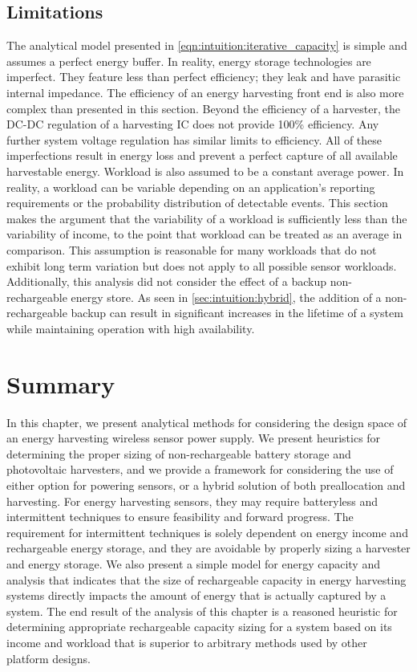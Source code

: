 \subsection{Limitations}
The analytical model presented in \cref{eqn:intuition:iterative_capacity} is simple and assumes a perfect energy buffer. In reality, energy storage technologies are imperfect. They feature less than perfect efficiency; they leak and have parasitic internal impedance.
The efficiency of an energy harvesting front end is also more complex than presented in this section.
Beyond the efficiency of a harvester, the DC-DC regulation of a harvesting IC does not provide 100\% efficiency.
Any further system voltage regulation has similar limits to efficiency.
All of these imperfections result in energy loss and prevent a perfect capture of all available harvestable energy.
Workload is also assumed to be a constant average power. In reality, a workload can be variable depending on an application's reporting requirements or the probability distribution of detectable events.
This section makes the argument that the variability of a workload is sufficiently less than the variability of income, to the point that workload can be treated as an average in comparison. This assumption is reasonable for many workloads that do not exhibit long term variation but does not apply to all possible sensor workloads.
Additionally, this analysis did not consider the effect of a backup non-rechargeable energy store. As seen in \cref{sec:intuition:hybrid}, the addition of a non-rechargeable backup can result in significant increases in the lifetime of a system while maintaining operation with high availability.


\section{Summary}
In this chapter, we present analytical methods for considering the design space of an energy harvesting wireless sensor power supply.
We present heuristics for determining the proper sizing of non-rechargeable battery storage and photovoltaic harvesters, and we provide a framework for considering the use of either option for powering sensors, or a hybrid solution of both preallocation and harvesting.
For energy harvesting sensors, they may require batteryless and intermittent techniques to ensure feasibility and forward progress.
The requirement for intermittent techniques is solely dependent on energy income and rechargeable energy storage, and they are avoidable by properly sizing a harvester and energy storage.
We also present a simple model for energy capacity and analysis that indicates that the size of rechargeable capacity in energy harvesting systems directly impacts the amount of energy that is actually captured by a system.
The end result of the analysis of this chapter is a reasoned heuristic for determining appropriate rechargeable capacity sizing for a system based on its income and workload that is superior to arbitrary methods used by other platform designs.

